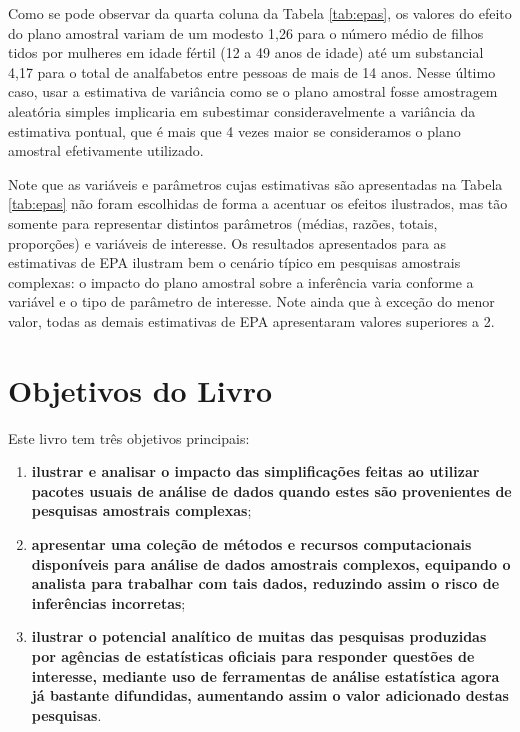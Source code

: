 \documentclass[]{book}
\theoremstyle{definition}
\theoremstyle{definition}
\theoremstyle{definition}
\theoremstyle{remark}
\begin{document}
Como se pode observar da quarta coluna da Tabela \ref{tab:epas}, os
valores do efeito do plano amostral variam de um modesto 1,26 para o
número médio de filhos tidos por mulheres em idade fértil (12 a 49 anos
de idade) até um substancial 4,17 para o total de analfabetos entre
pessoas de mais de 14 anos. Nesse último caso, usar a estimativa de
variância como se o plano amostral fosse amostragem aleatória simples
implicaria em subestimar consideravelmente a variância da estimativa
pontual, que é mais que 4 vezes maior se consideramos o plano amostral
efetivamente utilizado.

Note que as variáveis e parâmetros cujas estimativas são apresentadas na
Tabela \ref{tab:epas} não foram escolhidas de forma a acentuar os
efeitos ilustrados, mas tão somente para representar distintos
parâmetros (médias, razões, totais, proporções) e variáveis de
interesse. Os resultados apresentados para as estimativas de EPA
ilustram bem o cenário típico em pesquisas amostrais complexas: o
impacto do plano amostral sobre a inferência varia conforme a variável e
o tipo de parâmetro de interesse. Note ainda que à exceção do menor
valor, todas as demais estimativas de EPA apresentaram valores
superiores a 2.

\section{Objetivos do Livro}\label{objetivos-do-livro}

Este livro tem três objetivos principais:

\begin{enumerate}
\def\labelenumi{\arabic{enumi})}
\item
  \textbf{ilustrar e analisar o impacto das simplificações feitas ao
  utilizar pacotes usuais de análise de dados quando estes são
  provenientes de pesquisas amostrais complexas};
\item
  \textbf{apresentar uma coleção de métodos e recursos computacionais
  disponíveis para análise de dados amostrais complexos, equipando o
  analista para trabalhar com tais dados, reduzindo assim o risco de
  inferências incorretas};
\item
  \textbf{ilustrar o potencial analítico de muitas das pesquisas
  produzidas por agências de estatísticas oficiais para responder
  questões de interesse, mediante uso de ferramentas de análise
  estatística agora já bastante difundidas, aumentando assim o valor
  adicionado destas pesquisas}.
\end{enumerate}
\end{document}
